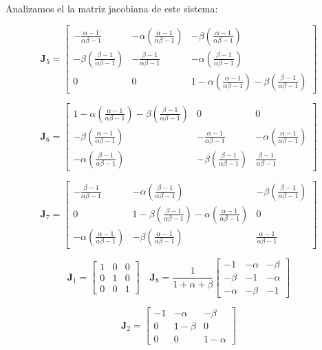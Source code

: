 \documentclass[twocolumn,aps,prl]{revtex4-1}
\newcommand{\talf}{\frac{\alpha - 1}{\alpha \beta - 1} }
\newcommand{\tbet}{\frac{\beta  - 1}{\alpha \beta - 1} }
\begin{document}
Analizamos el la matriz jacobiana de este sistema:


$$
\mathbf{J}_5 = 
\begin{bmatrix}
    -\talf  & - \alpha (\talf)& - \beta (\talf)\\
    - \beta (\tbet) & -\tbet & - \alpha (\tbet) \\
    0 & 0 & 1 - \alpha (\talf) - \beta (\tbet)
\end{bmatrix}
$$

$$
\mathbf{J}_6 = 
\begin{bmatrix}
    1 - \alpha (\talf) - \beta (\tbet) & 0 & 0 \\
    - \beta (\talf) & -\talf & - \alpha (\talf) \\
    - \alpha (\tbet) & - \beta (\tbet) & \tbet
\end{bmatrix}
$$

$$
\mathbf{J}_7 = 
\begin{bmatrix}
    -\tbet & - \alpha (\tbet) & - \beta (\tbet) \\
    0 & 1 - \beta (\tbet) - \alpha (\talf) & 0 \\
    - \alpha (\talf) & - \beta (\talf) & \talf
\end{bmatrix}
$$


$$
\mathbf{J}_1 = 
\begin{bmatrix}
    1  & 0 & 0 \\
    0 & 1 & 0 \\
    0 & 0 & 1
\end{bmatrix}
\quad 
\mathbf{J}_8 = 
\frac{1}{1+\alpha+\beta}\begin{bmatrix}
    -1 & -\alpha & -\beta \\
    -\beta & -1 & -\alpha \\
    -\alpha & -\beta & -1
\end{bmatrix}
$$

$$
\mathbf{J}_2 = 
\begin{bmatrix}
    -1 & - \alpha & - \beta \\
    0 & 1-\beta & 0 \\
    0 & 0 & 1- \alpha
\end{bmatrix}
$$
\end{document}
